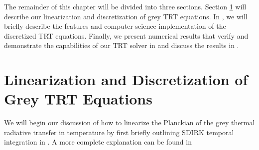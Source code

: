 The remainder of this chapter will be divided into three sections.  Section \ref{sec:chap6_linearization} will describe our linearization and discretization of grey TRT equations.  
In , we will briefly describe the features and computer science implementation of the discretized TRT equations.  
Finally, we present numerical results that verify and demonstrate the capabilities of our TRT solver in  and discuss the results in .

\section{Linearization and Discretization of Grey TRT Equations}
\label{sec:chap6_linearization}
We will begin our discussion of how to linearize the Planckian of the grey thermal radiative transfer in temperature by first briefly outlining SDIRK temporal integration in .
A more complete explanation can be found in \cite{alexander}

